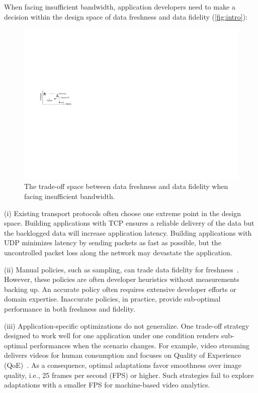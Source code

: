 
When facing insufficient bandwidth, application developers need to make a
decision within the design space of data freshness and data fidelity
(\autoref{fig:intro}):

\begin{figure}
  \centering
  \includegraphics[width=0.9\linewidth]{figures/intro.pdf}
  \caption{The trade-off space between data freshness and data fidelity when
    facing insufficient bandwidth.}
  \label{fig:intro}
  \vspace{-1em}
\end{figure}

(i) Existing transport protocols often choose one extreme point in the design
space. Building applications with TCP ensures a reliable delivery of the data
but the backlogged data will increase application latency. Building applications
with UDP minimizes latency by sending packets as fast as possible, but the
uncontrolled packet loss along the network may devastate the application.

(ii) Manual policies, such as sampling, can trade data fidelity for
freshness~\cite{rabkin2014aggregation}. However, these policies are often
developer heuristics without measurements backing up. An accurate policy often
requires extensive developer efforts or domain expertise. Inaccurate policies,
in practice, provide sub-optimal performance in both freshness and fidelity.

(iii) Application-specific optimizations do not generalize. One trade-off
strategy designed to work well for one application under one condition renders
sub-optimal performances when the scenario changes. For example, video streaming
delivers videos for human consumption and focuses on Quality of Experience
(QoE)~\cite{yin2015control}. As a consequence, optimal adaptations favor
smoothness over image quality, i.e., 25 frames per second (FPS) or higher. Such
strategies fail to explore adaptations with a smaller FPS for machine-based
video analytics.

